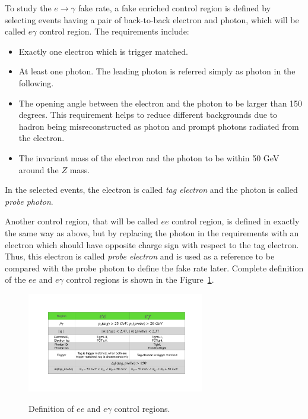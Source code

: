 To study the $e\to\gamma$ fake rate, a fake enriched control region is defined by selecting events having a pair of back-to-back electron and photon, which will be called $e\gamma$ control region. The requirements include:
\begin{itemize}
\item Exactly one electron which is trigger matched.
\item At least one photon. The leading \pt photon is referred simply as photon in the following.
\item The opening angle between the electron and the photon to be larger than 150 degrees. This requirement helps to reduce different backgrounds due to hadron being misreconstructed as photon and prompt photons radiated from the electron.
\item The invariant mass of the electron and the photon to be within 50 GeV around the $Z$ mass. 
\end{itemize}
In the selected events, the electron is called \textit{tag electron} and the photon is called \textit{probe photon}.

Another control region, that will be called $ee$ control region, is defined in exactly the same way as above, but by replacing the photon in the requirements with an electron which should have opposite charge sign with respect to the tag electron. Thus, this electron is called \textit{probe electron} and is used as a reference to be compared with the probe photon to define the fake rate later. Complete definition of the $ee$ and $e\gamma$ control regions is shown in the Figure~\ref{fig:egammafake_cr}.

\begin{figure}[!htbp]
\centering
{\includegraphics[width=0.69\textwidth]{figures/egammafakes/efakeCR.pdf}}
\caption [] {Definition of $ee$ and $e\gamma$ control regions.}
\label{fig:egammafake_cr}
\end{figure} 

